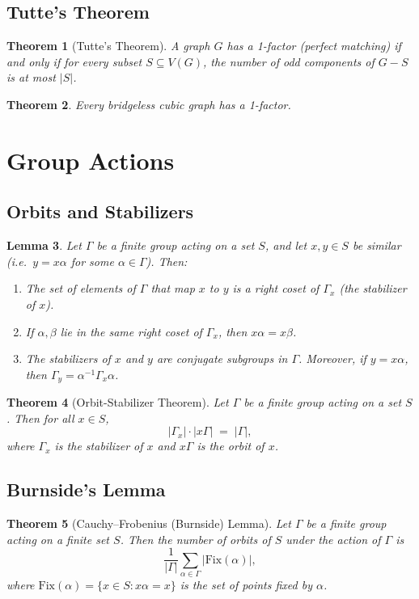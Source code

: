 \documentclass{article}
\newtheorem{theorem}{Theorem}[section]
\newtheorem{lemma}[theorem]{Lemma}
\begin{document}
\subsection{Tutte's Theorem}
\begin{theorem}[Tutte's Theorem]
A graph $G$ has a 1-factor (perfect matching) if and only if for every subset $S\subseteq V(G)$, the number of odd components of $G-S$ is at most $|S|$.
\end{theorem}

\begin{theorem}
Every bridgeless cubic graph has a 1-factor.
\end{theorem}

\section{Group Actions}

\subsection{Orbits and Stabilizers}
\begin{lemma}
Let $\Gamma$ be a finite group acting on a set $S$, and let $x,y\in S$ be similar (i.e.\ $y=x\alpha$ for some $\alpha\in\Gamma$). Then:
\begin{enumerate}
\item The set of elements of $\Gamma$ that map $x$ to $y$ is a right coset of $\Gamma_x$ (the stabilizer of $x$).
\item If $\alpha,\beta$ lie in the same right coset of $\Gamma_x$, then $x\alpha = x\beta$.
\item The stabilizers of $x$ and $y$ are conjugate subgroups in $\Gamma$. Moreover, if $y = x\alpha$, then $\Gamma_y = \alpha^{-1}\Gamma_x\alpha$.
\end{enumerate}
\end{lemma}

\begin{theorem}[Orbit-Stabilizer Theorem]
Let $\Gamma$ be a finite group acting on a set $S$. Then for all $x\in S$,
$$
|\Gamma_x|\cdot |x\Gamma| \;=\; |\Gamma|,
$$
where $\Gamma_x$ is the stabilizer of $x$ and $x\Gamma$ is the orbit of $x$.
\end{theorem}

\subsection{Burnside's Lemma}
\begin{theorem}[Cauchy--Frobenius (Burnside) Lemma]
Let $\Gamma$ be a finite group acting on a finite set $S$. Then the number of orbits of $S$ under the action of $\Gamma$ is
$$
\frac{1}{|\Gamma|} \sum_{\alpha\in \Gamma} |\mathrm{Fix}(\alpha)|,
$$
where $\mathrm{Fix}(\alpha)=\{x\in S: x\alpha = x\}$ is the set of points fixed by $\alpha$.
\end{theorem}
\end{document}
